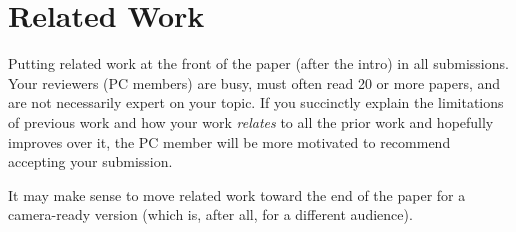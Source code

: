 \section{Related Work}
\label{sec:related}

Putting related work at the front of the paper (after the intro) in
all submissions.  Your reviewers (PC members) are busy, must often
read 20 or more papers, and are not necessarily expert on your topic.
If you succinctly explain the limitations of previous work and how
your work \emph{relates} to all the prior work and hopefully improves
over it, the PC member will be more motivated to recommend accepting
your submission.

It may make sense to move related work toward the end of the paper for
a camera-ready version (which is, after all, for a different
audience).


